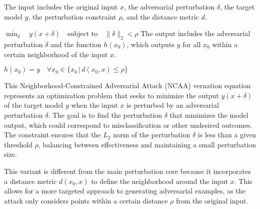 The input includes the original input $x$, the adversarial perturbation $\delta$, the target model $y$, the perturbation constraint $\rho$, and the distance metric $d$.

$\min_{\delta} \quad y(x + \delta) \quad \text{subject to} \quad \| \delta \|_2 < \rho$
The output includes the adversarial perturbation $\delta$ and the function $h(x_0)$, which outputs $y$ for all $x_0$ within a certain neighborhood of the input $x$.

$h(x_0) = y \quad \forall x_0 \in \{ x_0 \, | \, d(x_0, x) \leq \rho \}$

This Neighborhood-Constrained Adversarial Attack (NCAA) vernation equation represents an optimization problem that seeks to minimize the output $y(x + \delta)$ of the target model $y$ when the input $x$ is perturbed by an adversarial perturbation $\delta$. The goal is to find the perturbation $\delta$ that minimizes the model output, which could correspond to misclassification or other undesired outcomes. The constraint ensures that the $L_2$ norm of the perturbation $\delta$ is less than a given threshold $\rho$, balancing between effectiveness and maintaining a small perturbation size.

This variant is different from the main perturbation core because it incorporates a distance metric $d(x_0, x)$ to define the neighborhood around the input $x$. This allows for a more targeted approach to generating adversarial examples, as the attack only considers points within a certain distance $\rho$ from the original input.